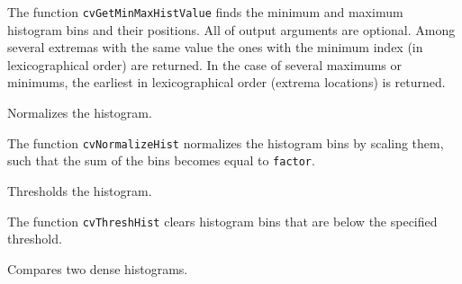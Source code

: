 \begin{description}
\end{description}

The function \texttt{cvGetMinMaxHistValue} finds the minimum and
maximum histogram bins and their positions. All of output arguments are
optional. Among several extremas with the same value the ones with the
minimum index (in lexicographical order) are returned. In the case of several maximums
or minimums, the earliest in lexicographical order (extrema locations)
is returned.

\label{NormalizeHist}

Normalizes the histogram.


\begin{description}
\end{description}

The function \texttt{cvNormalizeHist} normalizes the histogram bins by scaling them, such that the sum of the bins becomes equal to \texttt{factor}.

\label{ThreshHist}

Thresholds the histogram.


\begin{description}
\end{description}

The function \texttt{cvThreshHist} clears histogram bins that are below the specified threshold.

\label{CompareHist}

Compares two dense histograms.


